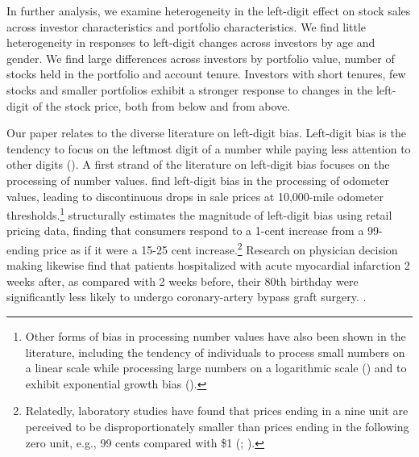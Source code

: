 In further analysis, we examine heterogeneity in the left-digit effect on stock sales across investor characteristics and portfolio characteristics. We find little heterogeneity in responses to left-digit changes across investors by age and gender. We find large differences across investors by portfolio value, number of stocks held in the portfolio and account tenure. Investors with short tenures, few stocks and smaller portfolios exhibit a stronger response to changes in the left-digit of the stock price, both from below and from above.

Our paper relates to the diverse literature on left-digit bias. Left-digit bias is the tendency to focus on the leftmost digit of a number while paying less attention to other digits (\citealp{poltrock1984comparative}). A first strand of the literature on left-digit bias focuses on the processing of number values. \cite{lacetera2012heuristic} find left-digit bias in the processing of odometer values, leading to discontinuous drops in sale prices at 10,000-mile odometer thresholds.\footnote{Other forms of bias in processing number values have also been shown in the literature, including the tendency of individuals to process small numbers on a linear scale while processing large numbers on a logarithmic scale (\citealp{roger2018behavioral}) and to exhibit exponential growth bias (\citealp{stango2009exponential}).} \cite{shlain2018more} structurally estimates the magnitude of left-digit bias using retail pricing data, finding that consumers respond to a 1-cent increase from a 99-ending price as if it were a 15-25 cent increase.\footnote{Relatedly, laboratory studies have found that prices ending in a nine unit are perceived to be disproportionately smaller than prices ending in the following zero unit, e.g., 99 cents compared with \$1 (\citealp{thomas2005penny}; \citealp{manning2009price}).} Research on physician decision making likewise find that patients hospitalized with acute myocardial infarction 2 weeks after, as compared with 2 weeks before, their 80th birthday were significantly less likely to undergo coronary-artery bypass graft surgery. \cite{olenski2020behavioral}.  

